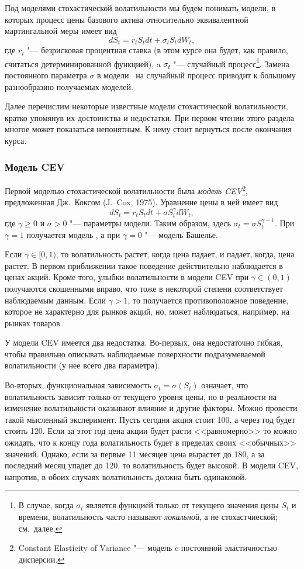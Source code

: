 Под моделями стохастической волатильности мы будем понимать модели, в которых процесс цены базового актива относительно эквивалентной мартингальной меры имеет вид
\[
dS_t = r_tS_t dt + \sigma_t S_t dW_t,
\]
где $r_t$ "--- безрисковая процентная ставка (в этом курсе она будет, как правило, считаться детерминированной функцией), a $\sigma_t$ "--- случайный процесс\footnote{В случае, когда $\sigma_t$ является функцией только от текущего значения цены $S_t$ и времени, волатильность часто называют \emph{локальной}, а не стохастчиеской; см.~далее.}.
Замена постоянного параметра $\sigma$ в модели \bs\ на случайный процесс приводит к большому разнообразию получаемых моделей. 

Далее перечислим некоторые известные модели стохастической волатильности, кратко упомянув их достоинства и недостатки.
При первом чтении этого раздела многое может показаться непонятным.
К нему стоит вернуться после окончания курса.

\subsubsection{Модель CEV}

Первой моделью стохастической волатильности была \emph{модель CEV}\footnote{Constant Elasticity of Variance "--- модель c постоянной эластичностью дисперсии.}, предложенная Дж.~Коксом (J.~Cox, 1975).
Уравнение цены в ней имеет вид
\[
d S_t = r_tS_t dt + \sigma S_t^\gamma d W_t,
\]
где $\gamma \ge 0$ и $\sigma>0$ "--- параметры модели. Таким образом, здесь $\sigma_t = \sigma S_t^{\gamma-1}$. 
При $\gamma=1$ получается модель \bs, а при $\gamma=0$ "--- модель Башелье.

Если $\gamma\in[0,1)$, то волатильность растет, когда цена падает, и падает, когда, цена растет.
В первом приближении такое поведение действительно наблюдается в ценах акций.
Кроме того, улыбки волатильности в модели CEV при $\gamma\in(0,1)$ получаются скошенными вправо, что тоже в некоторой степени соответствует наблюдаемым данным.
Если $\gamma>1$, то получается противоположное поведение, которое не характерно для рынков акций, но, может наблюдаться, например, на рынках товаров.

У модели CEV имеется два недостатка.
Во-первых, она недостаточно гибкая, чтобы правильно описывать наблюдаемые поверхности подразумеваемой волатильности (у нее всего два параметра).

Во-вторых, функциональная зависимость $\sigma_t=\sigma(S_t)$ означает, что волатильность зависит только от текущего уровня цены, но в реальности на изменение волатильности оказывают влияние и другие факторы.
Можно провести такой мысленный эксперимент.
Пусть сегодня акция стоит 100, а через год будет стоить 120.
Если за этот год цена акции будет расти <<равномерно>> то можно ожидать, что к концу года волатильность будет в пределах своих <<обычных>> значений.
Однако, если за первые 11 месяцев цена вырастет до 180, а за последний месяц упадет до 120, то волатильность будет высокой. 
В модели CEV, напротив, в обоих случаях волатильность должна быть одинаковой.


